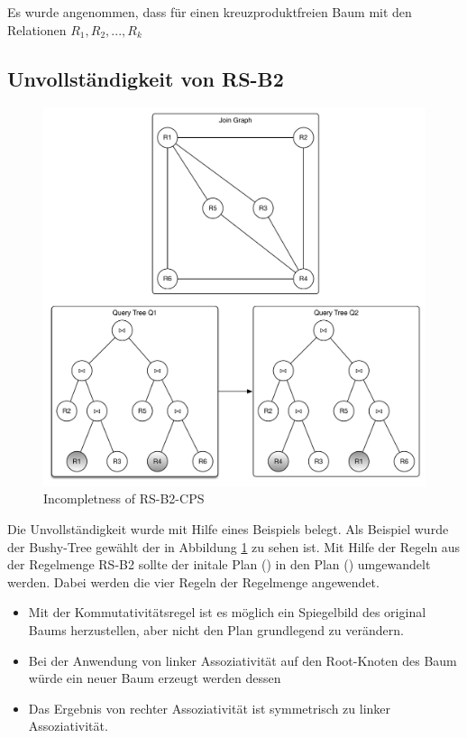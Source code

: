 Es wurde angenommen, dass für einen kreuzproduktfreien Baum mit den Relationen $R_1, R_2, ..., R_k$


\subsection{Unvollständigkeit von RS-B2}

\begin{figure}[ht]
  \centering
  \includegraphics[width=\textwidth]{02_Related_Work/Graphs.pdf}
  \caption{Incompletness of RS-B2-CPS}
  \label{Incompleteness_RS-B2-CPS}
\end{figure}


Die Unvollständigkeit wurde mit Hilfe eines Beispiels belegt. Als Beispiel wurde der Bushy-Tree gewählt der in Abbildung \ref{Incompleteness_RS-B2-CPS} zu sehen ist. Mit Hilfe der Regeln aus der Regelmenge RS-B2 sollte der initale Plan () in den Plan () umgewandelt werden. Dabei werden die vier Regeln der Regelmenge angewendet.

\begin{itemize}
\item Mit der Kommutativitätsregel ist es möglich ein Spiegelbild des original Baums herzustellen, aber nicht den Plan grundlegend zu verändern.
\item Bei der Anwendung von linker Assoziativität auf den Root-Knoten des Baum würde ein neuer Baum erzeugt werden dessen
\item Das Ergebnis von rechter Assoziativität ist symmetrisch zu linker Assoziativität.
\end{itemize}



